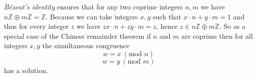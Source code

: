 \documentclass[english]{article}
\renewcommand{\mod}{\text{mod }}
\newcommand{\Int}{\mathbb{Z}}
\begin{document}
  \textit{Bézout's identity} ensures that for any two coprime integers $n,m$ we
  have $n \Int \oplus m \Int = \Int$. Because we can take integers $x,y$ such
  that $x \cdot n + y \cdot m = 1$ and thus for every integer $z$ we have
  $zx \cdot n + zy \cdot m = z$, hence $z \in n \Int \oplus m \Int$. So as a
  special case of the Chinese remainder theorem if $n$ and $m$ are coprime then
  for all integers $x,y$ the simultaneous congruence
  \[ w = x ~(\mod n) \]
  \[ w = y ~(\mod m) \]
  has a solution.
\end{document}
